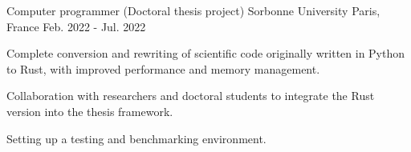 \begin{cventries}
  \cventry
  {Computer programmer (Doctoral thesis project)} %
  {Sorbonne University} %
  {Paris, France} %
  {Feb. 2022 - Jul. 2022} %
  {
    \begin{cvitems} %
      \item {Complete conversion and rewriting of scientific code originally written in Python to Rust, with improved performance and memory management.}
      \item {Collaboration with researchers and doctoral students to integrate the Rust version into the thesis framework.}
      \item {Setting up a testing and benchmarking environment.}
    \end{cvitems}
  }


\end{cventries}
